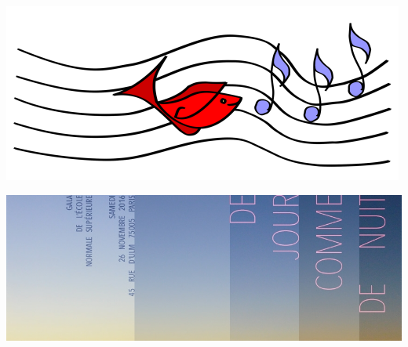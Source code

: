 \documentclass[a4paper,11pt,poets,durations]{ConcProg}
\begin{document}
\begin{center}
\includegraphics[scale=3]{logo.png}
\end{center}
\begin{center}
\includegraphics[scale=0.3]{logoNuit.jpg}
\end{center}
\end{document}
